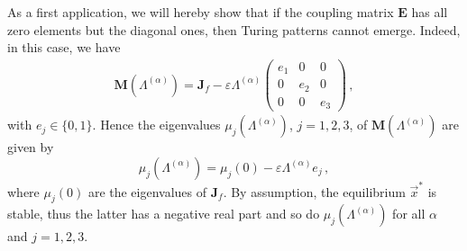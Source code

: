 \documentclass[aps,showpacs,preprintnumbers,amsmath,amssymb,twocolumn,superscriptaddress,floatfix,nofootinbib,10pt,pre]{revtex4-1}
\begin{document}
As a first application, we will hereby show that if the coupling matrix $\mathbf{E}$ has all zero elements but the diagonal ones, then Turing patterns cannot emerge. Indeed, in this case, we have
\begin{align}
\mathbf M(\Lambda^{(\alpha)}) =
\mathbf J_f - \varepsilon \Lambda^{(\alpha)} \left(\begin{matrix}
    e_1 & 0 & 0\\
    0 & e_2 & 0\\
    0 & 0 & e_3
\end{matrix}\right)\, ,
\end{align}
with $e_j\in\{0,1\}$. Hence the eigenvalues $\mu_j(\Lambda^{(\alpha)})$, $j=1,2,3$, of $\mathbf{M}(\Lambda^{(\alpha)})$ are given by
\begin{equation}
    \label{eq:eigMdiagE}
\mu_j(\Lambda^{(\alpha)}) = \mu_j(0) -\varepsilon \Lambda^{(\alpha)} e_j\, ,
\end{equation}
where $\mu_j(0)$ are the eigenvalues of $\mathbf{J}_f$. By assumption, the equilibrium $\vec{x}^*$ is stable, thus the latter has a negative real part and so do $\mu_j(\Lambda^{(\alpha)})$ for all $\alpha$ and $j=1,2,3$.\\
\end{document}
